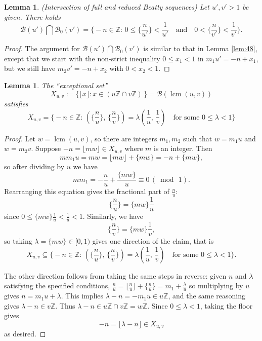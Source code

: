 \documentclass[12pt,letterpaper, reqno]{amsart}
\newtheorem{lem}[thm]{Lemma}
\theoremstyle{definition}
\theoremstyle{remark}
\newcommand{\ZZ}{\ensuremath{\mathbb{Z}}}
\newcommand{\uu}{{u'}}
\newcommand{\vv}{{v'}}
\newcommand{\sB}{{\mathcal B}}
\newcommand{\floor}[1]{\lfloor{#1}\rfloor}
\DeclareMathOperator{\lcm}{lcm}
\begin{document}
\begin{lem}\label{lem:beatty-intersection-third}
{\rm (Intersection of full and reduced Beatty sequences)} 
Let  $\uu, \vv >1$ be given. There holds 
\begin{equation*}
\sB(\uu) \bigcap \sB_0(\vv) =  \big\{ -n \in \ZZ: \,   0 \le \{  \frac{n}{\uu}\} < \frac{1}{\uu}  \quad \mbox{and} \quad 0 < \{ \frac{n}{\vv}\} < \frac{1}{\vv} \big\}.
\end{equation*}
\end{lem}

\begin{proof} 
The argument for $\sB(\uu) \bigcap \sB_0(\vv)$ is similar to that in Lemma \ref{lem:48}, except
that  we start with 
the non-strict inequality $0 \le x_1<1$ in $m_1\uu= -n+ x_1$, but we  still have
$m_2 \vv= -n+ x_2$ with $0< x_2 <1$.
\end{proof}

\begin{lem}\label{lem:78}
The ``exceptional set''
\[ X_{u,v} := \{ \floor{x} : x\in (u\ZZ\cap v\ZZ) \,\} = \sB(\lcm(u,v)) \]
satisfies
\[ X_{u,v} = \big\{ -n\in\ZZ: \, (\{\frac{n}{u}\},\, \{ \frac{n}{v}\}) =\lambda(\frac{1}{u},\, \frac{1}{v})   \quad\mbox{for some }0\leq \lambda<1\big\}\]
\end{lem}
 
\begin{proof} 
Let $w=\lcm(u,v)$, so there are integers $m_1, m_2$ such that $w = m_1 u$ and $w=m_2 v$.
Suppose $-n = \floor{mw} \in X_{u,v}$ where $m$ is an integer. Then
\[ mm_1 u = mw = \floor{mw} + \{mw\} = -n + \{mw\},\]
so after dividing by $u$ we have
\[ mm_1 = -\frac{n}{u} + \frac{\{mw\}}{u} \equiv 0 \,(\bmod \, 1).\]
Rearranging this equation gives the fractional part of $\frac n u$:
\[ \{ \frac{n}{u} \} = \{mw\}\frac1u\]
since $0\leq \{mw\}\frac1u < \frac1u < 1$. Similarly, we have
\[ \{ \frac{n}{v} \} = \{mw\}\frac1v,\]
so taking $\lambda = \{mw\} \in [0,1)$ gives one direction of the claim, that is
\[ X_{u,v} \subseteq \big\{ -n\in\ZZ: \, (\{\frac{n}{u}\},\, \{ \frac{n}{v}\}) =\lambda(\frac{1}{u},\, \frac{1}{v})   \quad\mbox{for some }0\leq \lambda<1\big\}.\]

The other direction follows from taking the same steps in reverse: given $n$ and $\lambda$ satisfying the specified conditions, $\frac n u = \floor{\frac n u} + \{ \frac n u\} = m_1 + \frac\lambda{u}$ so multiplying by $u$ gives $n = m_1 u + \lambda$. This implies $\lambda - n =-m_1u \in u\ZZ$, and the same reasoning gives $\lambda - n \in v\ZZ$. 
Thus $\lambda-n \in u\ZZ\cap v\ZZ = w\ZZ$. Since $0\leq \lambda <1$, taking the floor gives
\[ -n = \floor{\lambda-n} \in X_{u,v}\]
as desired.
\end{proof}
\end{document}
